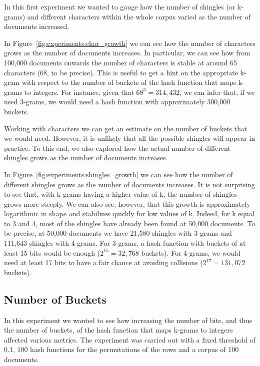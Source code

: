 \documentclass[runningheads]{llncs}
\begin{document}
In this first experiment we wanted to gauge how the number of shingles (or k-grams) and different characters within the whole corpus varied as the number of documents increased. 

In Figure~\ref{fig:experiments:char_growth} we can see how the number of characters grows as the number of documents increases. In particular, we can see how from 100,000 documents onwards the number of characters is stable at around 65 characters (68, to be precise). This is useful to get a hint on the appropriate k-gram with respect to the number of buckets of the hash function that maps k-grams to integers. For instance, given that $68^3 = 314,432$, we can infer that, if we used 3-grams, we would need a hash function with approximately 300,000 buckets.

Working with characters we can get an estimate on the number of buckets that we would need. However, it is unlikely that all the possible shingles will appear in practice. To this end, we also explored how the actual number of different shingles grows as the number of documents increases.

In Figure~\ref{fig:experiments:shingles_growth} we can see how the number of different shingles grows as the number of documents increases. It is not surprising to see that, with k-grams having a higher value of k, the number of shingles grows more steeply. We can also see, however, that this growth is approximately logarithmic in shape and stabilizes quickly for low values of k. Indeed, for k equal to 3 and 4, most of the shingles have already been found at 50,000 documents. To be precise, at 50,000 documents we have 21,580 shingles with 3-grams and 111,643 shingles with 4-grams. For 3-grams, a hash function with buckets of at least 15 bits would be enough ($2^{15} = 32,768$ buckets). For 4-grams, we would need at least 17 bits to have a fair chance at avoiding collisions ($2^{17} = 131,072$ buckets).  


\subsection{Number of Buckets}
\label{subsec:experiments:buckets}

In this experiment we wanted to see how increasing the number of bits, and thus the number of buckets, of the hash function that maps k-grams to integers affected various metrics. The experiment was carried out with a fixed threshold of 0.1, 100 hash functions for the permutations of the rows and a corpus of 100 documents.  
\end{document}
